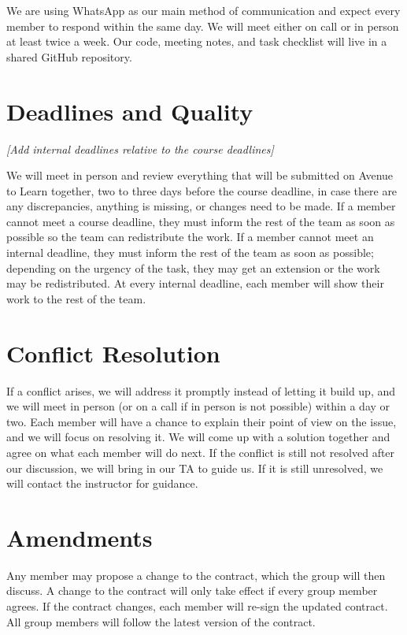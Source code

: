 \documentclass[12pt]{article}
\newcommand{\todo}[1]{\textcolor[HTML]{C0392B}{\textit{[#1]}}}
\begin{document}
We are using WhatsApp as our main method of communication and expect every member to respond within the same day. We will meet either on call or in person at least twice a week. Our code, meeting notes, and task checklist will live in a shared GitHub repository.

\section{Deadlines and Quality}

\todo{Add internal deadlines relative to the course deadlines}

We will meet in person and review everything that will be submitted on Avenue to Learn together, two to three days before the course deadline, in case there are any discrepancies, anything is missing, or changes need to be made. If a member cannot meet a course deadline, they must inform the rest of the team as soon as possible so the team can redistribute the work. If a member cannot meet an internal deadline, they must inform the rest of the team as soon as possible; depending on the urgency of the task, they may get an extension or the work may be redistributed. At every internal deadline, each member will show their work to the rest of the team.

\section{Conflict Resolution}

If a conflict arises, we will address it promptly instead of letting it build up, and we will meet in person (or on a call if in person is not possible) within a day or two. Each member will have a chance to explain their point of view on the issue, and we will focus on resolving it. We will come up with a solution together and agree on what each member will do next. If the conflict is still not resolved after our discussion, we will bring in our TA to guide us. If it is still unresolved, we will contact the instructor for guidance.

\section{Amendments}

Any member may propose a change to the contract, which the group will then discuss. A change to the contract will only take effect if every group member agrees. If the contract changes, each member will re-sign the updated contract. All group members will follow the latest version of the contract.
\end{document}
